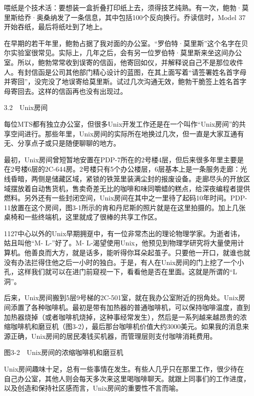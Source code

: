 \documentclass[a4paper,12pt,UTF8,twoside]{ctexbook}
\begin{document}
{喂纸是个技术活：要想装一盒折叠打印纸上去，须得技艺纯熟。有一次，鲍勃·莫里斯给乔·奥桑纳发了一条信息，其中包括100个反向换行。乔读信时，Model 37开始吞纸，最后将纸吐到了地上。

在早期的若干年里，鲍勃占据了我对面的办公室。“罗伯特·莫里斯”这个名字在贝尔实验室很常见。实际上，几年之后，会有另一位罗伯特·莫里斯来坐这间办公室。所以，鲍勃常常收到误寄的信函，他寄回如仪，并解释说自己不是那位收件人。有封信函是公司其他部门精心设计的蓝图，在其上面写着“请签署姓名首字母并寄回”，没完没了地误寄给莫里斯。试过几次沟通无效，鲍勃干脆签上姓名首字母寄回去。这样的信函再也没有出现过。





3.2　Unix房间


每位MTS都有独立办公室，但很多Unix开发工作还是在一个叫作“Unix房间”的共享空间进行。那些年里，Unix房间的实际所在地换过几次，但一直是大家互通有无、分享点子或只是随便聊聊的地方。

最初，Unix房间曾短暂地安置在PDP-7所在的2号楼4层，但后来很多年里主要是在2号楼6层的2C-644房。2号楼只有5个办公楼层，6层基本上是一条服务走廊：光线昏暗，两侧是储藏区域，紧锁的铁笼里装满尘封的报废设备。走廊尽头的开放区域摆放着自动售货机，售卖奇差无比的咖啡和味同嚼蜡的糕点，给深夜编程者提供燃料。另外还有一些封闭空间，Unix房间在其中之一里待了起码10年时间。PDP-11放置在这个房间，图3-1所示的肯和丹尼斯的照片就是在这里拍摄的。加上几张桌椅和一些终端机，这里就成了很棒的共享工作区。

1127中心以外的Unix早期拥趸中，有一位非常杰出的理论物理学家。为逝者讳，姑且叫他“M- L-”好了。M- L-渴望使用Unix，他预见到物理学研究将大量使用计算机。他善良而大方，就是话多，能听得你耳朵起茧子。只要他一开口，就谁也就没有办法拦得住他之后一小时的独白。于是，有人在Unix房间的门上挖了一个小孔，这样我们就可以在进门前窥视一下，看看他是否在里面。这就是所谓的“L洞”。

后来，Unix房间搬到5层9号梯的2C-501室，就在我办公室附近的拐角处。Unix房间添置了各种咖啡机。最初是带有加热器的普通咖啡机，可以保持咖啡温度，直到加热器烧掉（或者咖啡机烧掉，这种事经常发生），然后是一系列越来越昂贵的浓缩咖啡机和磨豆机（图3-2），最后那台咖啡机价值大约3000美元。如果我的消息来源正确，Unix房间的居民凑钱买机器，而管理层则支付咖啡消耗费用。



图3-2　Unix房间的浓缩咖啡机和磨豆机

Unix房间趣味十足，总有一些事情在发生。有些人几乎只在那里工作，很少待在自己办公室，其他人则会每天多次来这里喝咖啡聊天。就跟上同事们的工作进度，以及创造和保持社区感而言，Unix房间的重要性不言而喻。

}
\end{document}
